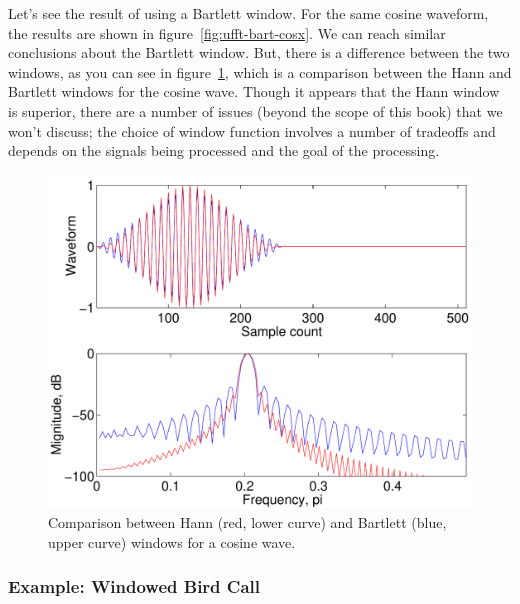 Let's see the result of using a Bartlett window. For the same cosine
waveform, the results are shown in figure~\ref{fig:ufft-bart-cosx}.
We can reach similar conclusions about the Bartlett window. But, there
is a difference between the two windows, as you can see in
figure~\ref{fig:ufft-hnba-cosx}, which is a comparison between the
Hann and Bartlett windows for the cosine wave. Though it appears that
the Hann window is superior, there are a number of issues (beyond the
scope of this book) that we won't discuss; the choice of window
function involves a number of tradeoffs and depends on the signals
being processed and the goal of the processing.

\begin{figure}
\centerline{\includegraphics[height=0.35\textheight]{ch-fft/ufft_hannbartl_cosx512_256}}
\caption[Comparison between Hann and Bartlett windows for
a cosine wave]{Comparison between Hann (red, lower curve) and Bartlett
(blue, upper curve) windows for a cosine
wave.\label{fig:ufft-hnba-cosx}}
\end{figure}

\subsubsection{Example: Windowed Bird Call}

